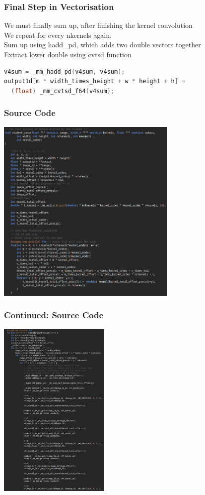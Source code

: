 \documentclass{beamer}
\begin{document}
\begin{frame}[fragile]
\frametitle{Final Step in Vectorisation}
We must finally sum up, after finishing the kernel convolution \\
We repeat for every nkernels again. \\
Sum up using hadd\_pd, which adds two double vectors together \\
Extract lower double using cvtsd function
\begin{lstlisting}[language=C,keywordstyle=\color{blue}]
v4sum = _mm_hadd_pd(v4sum, v4sum); 
output1d[m * width_times_height + w * height + h] = 
  (float) _mm_cvtsd_f64(v4sum); 
\end{lstlisting}
\end{frame}

\begin{frame}[fragile]
\frametitle{Source Code}
\includegraphics[width=0.65\textwidth]{images/student-conv-part1}
\end{frame}

\begin{frame}[fragile]
\frametitle{Continued: Source Code}
\includegraphics[width=0.4\textwidth]{images/student-conv-part2}
\end{frame}
\end{document}
